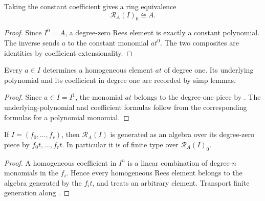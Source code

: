 \begin{lemma}
  \label{lemma:nagata-rees-degree-zero}

  Taking the constant coefficient gives a ring equivalence
  \[
    \mathcal R_A(I)_0\cong A.
  \]
\end{lemma}

\begin{proof}
  Since $I^0=A$, a degree-zero Rees element is exactly a constant polynomial.
  The inverse sends $a$ to the constant monomial $at^0$.  The two composites
  are identities by coefficient extensionality.
\end{proof}

\begin{lemma}
  \label{lemma:nagata-rees-degree-one-element}

  Every $a\in I$ determines a homogeneous element $at$ of degree one.  Its
  underlying polynomial and its coefficient in degree one are recorded by
  simp lemmas.
\end{lemma}

\begin{proof}
  Since $a\in I=I^1$, the monomial $at$ belongs to the degree-one piece by
  .  The underlying-polynomial and
  coefficient formulas follow from the corresponding formulas for a
  polynomial monomial.
\end{proof}

\begin{proposition}
  \label{prop:nagata-rees-finite-generation}

  If $I=(f_0,\ldots,f_r)$, then $\mathcal R_A(I)$ is generated as an algebra
  over its degree-zero piece by $f_0t,\ldots,f_rt$.  In particular it is of
  finite type over $\mathcal R_A(I)_0$.
\end{proposition}

\begin{proof}
  A homogeneous coefficient in $I^n$ is a linear combination of degree-$n$
  monomials in the $f_i$.  Hence every homogeneous Rees element belongs to the
  algebra generated by the $f_it$, and
   treats an arbitrary element.
  Transport finite generation along
  .
\end{proof}

